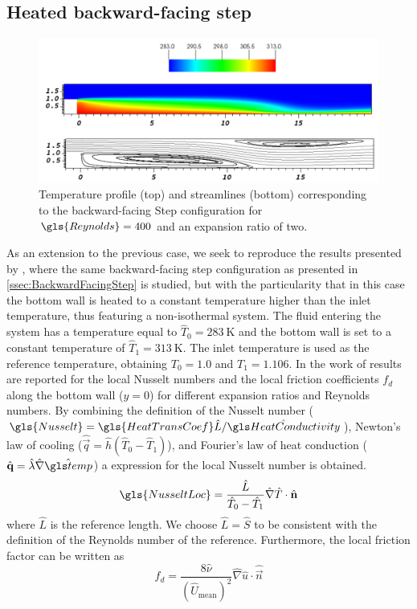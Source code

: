 
\subsection{Heated backward-facing step}\label{ssec:HeatedBackwardFacingStep}
\begin{figure}[tb]
	\begin{center}
		\includegraphics[width=\linewidth]{../plots/HBFS_TemperatureRe700_2.pdf}
		\caption{Temperature profile (top) and streamlines (bottom) corresponding to the backward-facing Step configuration for $\gls{Reynolds} = 400$ and an expansion ratio of two.}
		\label{BFS_Streamlines}
	\end{center}
\end{figure}

As an extension to the previous case, we seek to reproduce the results presented by \cite{xieFluidFlowHeat2016}, where the same backward-facing step configuration as presented in \cref{ssec:BackwardFacingStep} is studied, but with the particularity that in this case the bottom wall is heated to a constant temperature higher than the inlet temperature, thus featuring a non-isothermal system. The fluid entering the system has a temperature equal to $\hat T_0 = \SI{283}{\kelvin}$ and the bottom wall is set to a constant temperature of $\hat T_1 =\SI{313}{\kelvin}$. The inlet temperature is used as the reference temperature, obtaining $T_0 = 1.0$ and $T_1 = 1.106$.
In the work of \cite{xieFluidFlowHeat2016} results are reported for the local Nusselt numbers and the local friction coefficients $f_d$  along the bottom wall ($y = 0$) for different expansion ratios and Reynolds numbers.
By combining the definition of the Nusselt number ($\gls{Nusselt} = \gls{HeatTransCoef}\hat{L}/\glsHat{HeatConductivity}$), Newton's law of cooling ($\hat{\vec{q}} = \hat{h} (\hat{T}_0 - \hat{T}_1 )$), and Fourier's law of heat conduction ($\hat{\vec{q}} = \hat \lambda \hat{\nabla} \glsHat{temp}$) a expression for the local Nusselt number is obtained.
\begin{equation}
	\gls{NusseltLoc} = \frac{\hat L}{\hat T_0-\hat T_1}\hat \nabla \hat T \cdot \hat {\vec{n}}
\end{equation}
where $\hat L$ is the reference length. We choose $ \hat L = \hat S$ to be consistent with the definition of the Reynolds number of the reference. Furthermore, the local friction factor can be written as %
\begin{equation}
	f_d = \frac{8\hat \nu} { (\hat U_{\text{mean}})^2}  \hat \nabla \hat u \cdot \hat {\vec{n}}
\end{equation}

